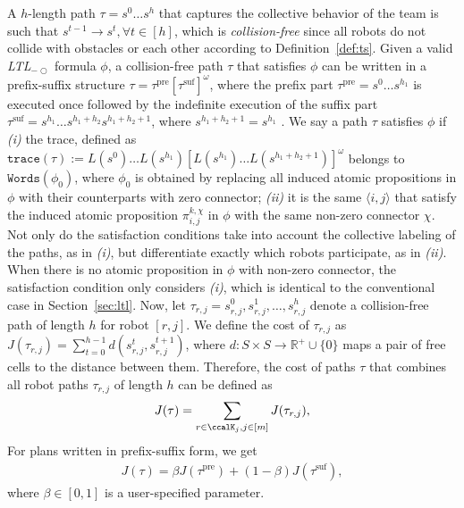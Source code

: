 \documentclass[Afour,sageh,times]{sagej}
\newcommand{\ltl}{ {\it LTL}$_{-\bigcirc}$ }
\newcommand{\ag}[2]{\langle#1,#2\rangle}
\renewcommand{\ap}[3]{\mathcal{\pi}_{{#1},{#2}}^{#3}}
\begin{document}
 A $h$-length path $\tau = s^0 \ldots s^h$ that captures the collective behavior of the team is such that $s^{t-1}\to s^{t}, \forall t\in[h]$, which is {\it collision-free} since all robots do not collide with obstacles or each other according to Definition~\ref{def:ts}.  Given a valid\ltl formula $\phi$, a collision-free path $\tau$ that satisfies $\phi$ can be written in a prefix-suffix structure $\tau=\tau^{\text{pre}}[\tau^{\text{suf}}]^\omega$, where the prefix part  $\tau^{\text{pre}}=s^0 \dots s^{h_1}$ is executed once followed by the indefinite execution of the suffix part $\tau^{\text{suf}}=s^{h_1} \dots s^{h_1+h_2} s^{h_1+h_2+1}$, where $s^{h_1+h_2+1}=s^{h_1}$ \cite{baier2008principles}. We say a path $\tau$ satisfies $\phi$ if {\it (i)} the trace, defined as $\texttt{trace}(\tau):=L(s^0)\dots L(s^{h_1})[L(s^{h_1})\dots L(s^{h_1+h_2+1})]^{\omega}$  belongs to $\texttt{Words}(\phi_0)$, where $\phi_0$ is obtained by replacing all induced atomic propositions in $\phi$ with their counterparts with zero connector; {\it (ii)} it is the same $\ag{i}{j}$ that satisfy the induced atomic proposition $\ap{i}{j}{k,\chi}$ in $\phi$ with the same non-zero connector $\chi$. Not only do the satisfaction conditions take into account the collective labeling of the paths, as in {\it (i)}, but differentiate exactly which robots participate, as in {\it (ii)}. When there is no atomic proposition in $\phi$ with non-zero connector, the satisfaction condition only considers {\it (i)}, which is identical to the conventional case in Section~\ref{sec:ltl}. Now, let $\tau_{r,j} = s_{r,j}^0, s_{r,j}^1, \ldots, s_{r,j}^h$ denote a collision-free path of length $h$ for robot $[r,j]$. We define the cost of $\tau_{r,j}$  as $J(\tau_{r,j}) = \sum_{t=0}^{h-1} d(s_{r,j}^{t}, s_{r,j}^{t+1})$, where $d: S\times S \to \mathbb{R}^+\cup\{0\}$ maps a pair of free cells to the distance between them. Therefore, the cost of paths $\tau$ that combines all robot paths $\tau_{r,j}$ of length $h$ can be defined as
\begingroup\makeatletter\def\f@size{10}\check@mathfonts
\def\maketag@@@#1{\hbox{\m@th\normalsize\normalfont#1}}%
\begin{align}
  J(\tau) = \sum_{{r \in \ccalK_j, j \in [m]}} J(\tau_{r,j}),
\end{align}
\endgroup
For  plans written in prefix-suffix form, we get
\begingroup\makeatletter\def\f@size{10}\check@mathfonts
\def\maketag@@@#1{\hbox{\m@th\normalsize\normalfont#1}}%
\begin{align}\label{eq:cost}
J(\tau) = \beta J(\tau^{\text{pre}}) + (1-\beta) J(\tau^{\text{suf}}),
\end{align}
\endgroup
where $\beta\in [0,1]$ is a user-specified parameter.
\end{document}
